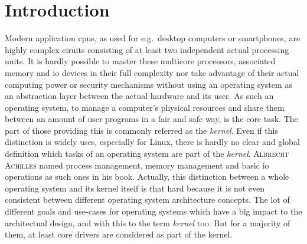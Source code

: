 
\chapter{Introduction}\label{ch:introduction}



Modern application \acp{cpu}, as used for e.g.\ desktop computers or smartphones, are highly complex ciruits consisting of at least two independent actual processing units.
It is hardly possible to master these multicore processors, associated memory and \ac{io} devices in their full complexity nor take advantage of their actual computing power or security mechanisms without using an operating system as an abstraction layer between the actual hardware and its user.
As such an operating system, to manage a computer's physical resources and share them between an amount of user programs in a fair and safe way, is the core task.
The part of those providing this is commonly referred as the \textit{kernel}.  
Even if this distinction is widely uses, especially for Linux, there is hardly no clear and global definition which tasks of an operating system are part of the \textit{kernel}.
\textsc{Albrecht Achilles} named process management, memory management and basic \ac{io} operations as such ones in his book\cite{achilles2006betriebssysteme}.
Actually, this distinction between a whole operating system and its kernel itself is that hard because it is not even consistent between different operating system architecture concepts.
The lot of different goals and use-cases for operating systems which have a big impact to the architectual design, and with this to the term \textit{kernel} too. 
But for a majority of them, at least core drivers are considered as part of the kernel. 

